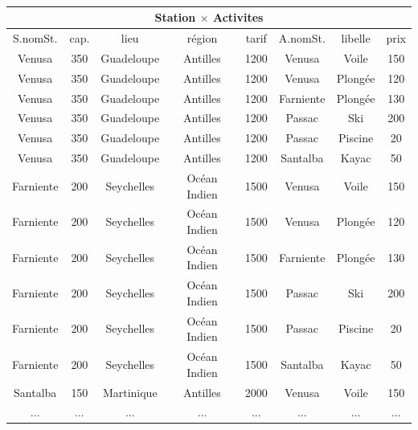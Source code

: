 \begin{slide}

{\tt
\begin{center}
\begin{tabular}{|c|c|c|c|c|c|c|c|}\hline
\multicolumn{8}{|c|}{Station $\times$ Activites}\\\hline \hline
S.nomSt. & cap. & lieu & r\'egion & tarif & A.nomSt. &
    libelle & prix \\ \hline
Venusa & 350 & Guadeloupe & Antilles & 1200 & Venusa & Voile & 150\\
Venusa & 350 & Guadeloupe & Antilles & 1200 & Venusa & Plong\'ee & 120\\
Venusa & 350 & Guadeloupe & Antilles & 1200 & Farniente & Plong\'ee & 130\\
Venusa & 350 & Guadeloupe & Antilles & 1200 & Passac & Ski & 200\\
Venusa & 350 & Guadeloupe & Antilles & 1200 & Passac & Piscine & 20\\
Venusa & 350 & Guadeloupe & Antilles & 1200 & Santalba & Kayac & 50\\
Farniente & 200 & Seychelles & Oc\'ean Indien & 1500 & Venusa & Voile & 150\\
Farniente & 200 & Seychelles & Oc\'ean Indien & 1500 & Venusa & Plong\'ee&120\\
Farniente & 200 & Seychelles & Oc\'ean Indien & 1500 & Farniente & Plong\'ee & 130\\
Farniente & 200 & Seychelles & Oc\'ean Indien & 1500 & Passac & Ski & 200\\
Farniente & 200 & Seychelles & Oc\'ean Indien & 1500 & Passac & Piscine & 20\\
Farniente & 200 & Seychelles & Oc\'ean Indien & 1500 & Santalba & Kayac & 50\\
Santalba & 150 & Martinique & Antilles & 2000 & Venusa & Voile & 150\\
... & ... & ... & ... & ...  & ... & ... & ... \\ \hline
\end{tabular}
\end{center}
}

\end{slide}

